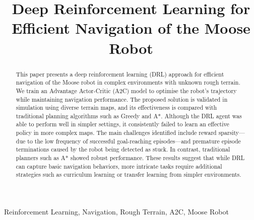\documentclass[conference]{IEEEtran}
\begin{document}
\title{Deep Reinforcement Learning for Efficient Navigation of the Moose Robot}

\author{
    \and
    \and
}


\maketitle

\begin{abstract}
This paper presents a deep reinforcement learning (DRL) approach for efficient navigation of the Moose robot in complex environments with unknown rough terrain. We train an Advantage Actor-Critic (A2C) model to optimise the robot's trajectory while maintaining navigation performance. The proposed solution is validated in simulation using diverse terrain maps, and its effectiveness is compared with traditional planning algorithms such as Greedy and A*. Although the DRL agent was able to perform well in simpler settings, it consistently failed to learn an effective policy in more complex maps. The main challenges identified include reward sparsity—due to the low frequency of successful goal-reaching episodes—and premature episode terminations caused by the robot being detected as stuck. In contrast, traditional planners such as A* showed robust performance. These results suggest that while DRL can capture basic navigation behaviors, more intricate tasks require additional strategies such as curriculum learning or transfer learning from simpler environments.
\end{abstract}


\begin{IEEEkeywords}
Reinforcement Learning, Navigation, Rough Terrain, A2C, Moose Robot
\end{IEEEkeywords}
\end{document}
